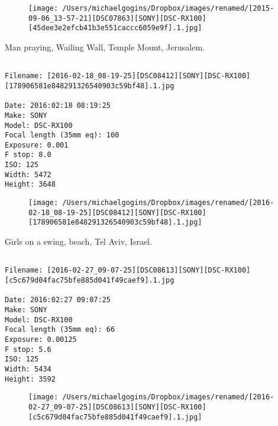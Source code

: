 \begin{figure}
\texttt{[image: /Users/michaelgogins/Dropbox/images/renamed/[2015-09-06\_13-57-21][DSC07863][SONY][DSC-RX100][45dee3e2efcb41b3e551caccc6059e9f].1.jpg]}
\end{figure}
    
\clearpage
\onecolumn
\noindent Man praying, Wailing Wall, Temple Mount, Jerusalem.
\noindent
\begin{lstlisting}

Filename: [2016-02-18_08-19-25][DSC08412][SONY][DSC-RX100][178906581e848291326540903c59bf48].1.jpg

Date: 2016:02:18 08:19:25
Make: SONY
Model: DSC-RX100
Focal length (35mm eq): 100
Exposure: 0.001
F stop: 8.0
ISO: 125
Width: 5472
Height: 3648
\end{lstlisting}
\clearpage

\begin{figure}
\texttt{[image: /Users/michaelgogins/Dropbox/images/renamed/[2016-02-18\_08-19-25][DSC08412][SONY][DSC-RX100][178906581e848291326540903c59bf48].1.jpg]}
\end{figure}
    
\clearpage
\onecolumn
\noindent Girls on a swing, beach, Tel Aviv, Israel.
\noindent
\begin{lstlisting}

Filename: [2016-02-27_09-07-25][DSC08613][SONY][DSC-RX100][c5c679d04fac75bfe885d041f49caef9].1.jpg

Date: 2016:02:27 09:07:25
Make: SONY
Model: DSC-RX100
Focal length (35mm eq): 66
Exposure: 0.00125
F stop: 5.6
ISO: 125
Width: 5434
Height: 3592
\end{lstlisting}
\clearpage

\begin{figure}
\texttt{[image: /Users/michaelgogins/Dropbox/images/renamed/[2016-02-27\_09-07-25][DSC08613][SONY][DSC-RX100][c5c679d04fac75bfe885d041f49caef9].1.jpg]}
\end{figure}
    
